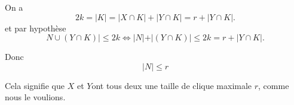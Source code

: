 \begin{sol}
On a $$ 2k = |K| = |X\cap K| + |Y\cap K| = r + |Y\cap K|. $$
et par hypothèse
$$N \cup (Y \cap K) | \le 2k \Leftrightarrow |N | + |(Y \cap K) | \le 2k = r + |Y\cap K|.$$

Donc
$$| N | \le r$$

Cela signifie que $X $ et $Y $ont tous deux une taille de clique maximale $r$, comme nous le voulions.
\end{sol}
